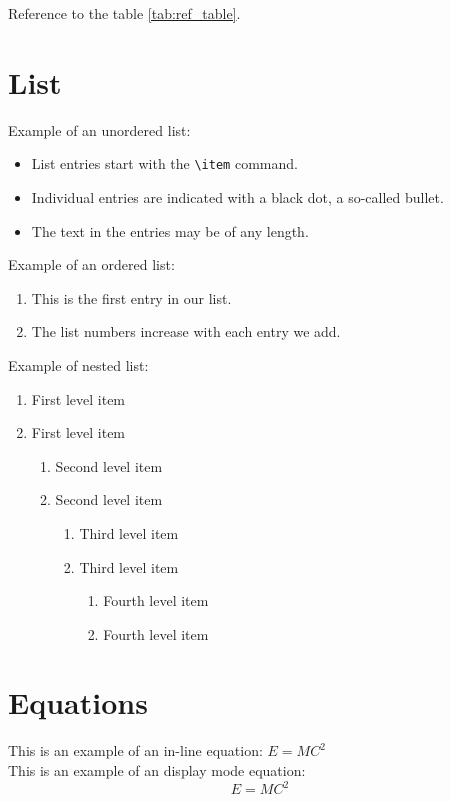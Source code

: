 \documentclass[a4paper, oneside]{book}
\begin{document}
Reference to the table \ref{tab:ref_table}.

\section{List}
Example of an unordered list:
\begin{itemize}
  \item List entries start with the \verb|\item| command.
  \item Individual entries are indicated with a black dot, a so-called bullet.
  \item The text in the entries may be of any length.
\end{itemize}

Example of an ordered list:
\begin{enumerate}
  \item This is the first entry in our list.
  \item The list numbers increase with each entry we add.
\end{enumerate}

Example of nested list:
\begin{enumerate}
   \item First level item
   \item First level item
   \begin{enumerate}
     \item Second level item
     \item Second level item
     \begin{enumerate}
       \item Third level item
       \item Third level item
       \begin{enumerate}
         \item Fourth level item
         \item Fourth level item
       \end{enumerate}
     \end{enumerate}
   \end{enumerate}
 \end{enumerate}


\section{Equations}

This is an example of an in-line equation: $E = MC^2$\\
This is an example of an display mode equation:
\begin{equation}
    E = MC^2
\label{eq}
\end{equation}
\end{document}
